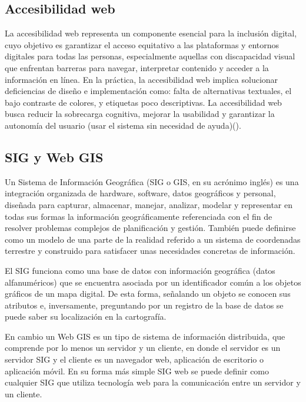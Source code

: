 \subsection{Accesibilidad web}

La accesibilidad web representa un componente esencial para la inclusión digital, cuyo objetivo es garantizar el acceso equitativo a las plataformas y entornos digitales para todas las personas, especialmente aquellas con discapacidad visual que enfrentan barreras para navegar, interpretar contenido y acceder a la información en línea.
En la práctica, la accesibilidad web implica solucionar deficiencias de diseño e implementación como: falta de alternativas textuales, el bajo contraste de colores, y etiquetas poco descriptivas.
La accesibilidad web busca reducir la sobrecarga cognitiva, mejorar la usabilidad y garantizar la autonomía del usuario (usar el sistema sin necesidad de ayuda)(\cite{alvarez2026implementacion}). 

\subsection{SIG y Web GIS}
\label{subsec:sig}
Un Sistema de Información Geográfica (SIG o GIS, en su acrónimo inglés) es una integración organizada de hardware, software, datos geográficos y personal, diseñada para capturar, almacenar, manejar, analizar, modelar y representar en todas sus formas la información geográficamente referenciada con el fin de resolver problemas complejos de planificación y gestión. También puede definirse como un modelo de una parte de la realidad referido a un sistema de coordenadas terrestre y construido para satisfacer unas necesidades concretas de información. 

El SIG funciona como una base de datos con información geográfica (datos alfanuméricos) que se encuentra asociada por un identificador común a los objetos gráficos de un mapa digital. De esta forma, señalando un objeto se conocen sus atributos e, inversamente, preguntando por un registro de la base de datos se puede saber su localización en la cartografía. \cite{sastre2010sistemas} 

En cambio un Web GIS es un tipo de sistema de información distribuida, que comprende por lo menos un servidor y un cliente, en donde el servidor es un servidor SIG y el cliente es un navegador web, aplicación de escritorio o aplicación móvil. En su forma más simple SIG web se puede definir como cualquier SIG que utiliza tecnología web para la comunicación entre un servidor y un cliente. \cite{vicente2016implementacion}

